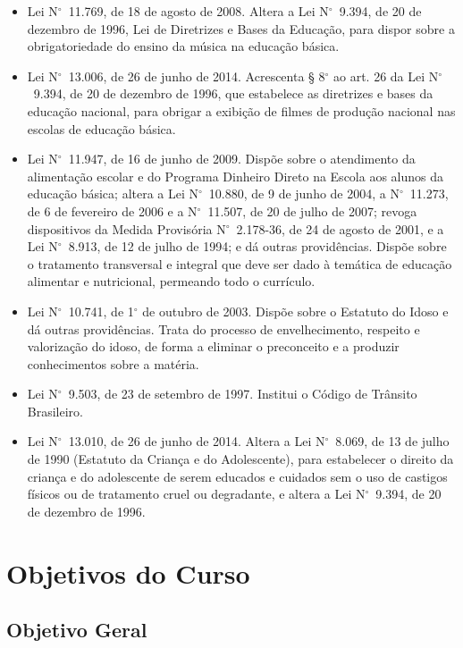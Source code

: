 \documentclass[
	12pt,				%
	openright,			%
	twoside,			%
	a4paper,			%
	chapter=TITLE,		%
	english,			%
	french,				%
	spanish,			%
	brazil,				%
	]{abntex2}
\newcommand{\n}{N$^\circ$}
\begin{document}
\begin{itemize}
    \item  Lei \n~11.769, de 18 de agosto de 2008. Altera a Lei \n~9.394, de 20 de dezembro de 1996, Lei de Diretrizes e Bases da Educação, para dispor sobre a obrigatoriedade do ensino da música na educação básica.
    \item  Lei \n~13.006, de 26 de junho de 2014. Acrescenta § 8$^\circ$ ao art. 26 da Lei \n~9.394, de 20 de dezembro de 1996, que estabelece as diretrizes e bases da educação nacional, para obrigar a exibição de filmes de produção nacional nas escolas de educação básica.
    \item  Lei \n~11.947, de 16 de junho de 2009. Dispõe sobre o atendimento da alimentação escolar e do Programa Dinheiro Direto na Escola aos alunos da educação básica; altera a Lei \n~10.880, de 9 de junho de 2004, a \n~11.273, de 6 de fevereiro de 2006 e a \n~11.507, de 20 de julho de 2007; revoga dispositivos da Medida Provisória \n~2.178-36, de 24 de agosto de 2001, e a Lei \n~8.913, de 12 de julho de 1994; e dá outras providências. Dispõe sobre o tratamento transversal e integral que deve ser dado à temática de educação alimentar e nutricional, permeando todo o currículo.
    
    \item Lei \n~10.741, de 1$^\circ$ de outubro de 2003. Dispõe sobre o Estatuto do Idoso e dá outras providências. Trata do processo de envelhecimento, respeito e valorização do idoso, de forma a eliminar o preconceito e a produzir conhecimentos sobre a matéria.
    \item Lei \n~9.503, de 23 de setembro de 1997. Institui o Código de Trânsito Brasileiro.
    \item  Lei \n~13.010, de 26 de junho de 2014. Altera a Lei \n~8.069, de 13 de julho de 1990 (Estatuto da Criança e do Adolescente), para estabelecer o direito da criança e do adolescente de serem educados e cuidados sem o uso de castigos físicos ou de tratamento cruel ou degradante, e altera a Lei \n~9.394, de 20 de dezembro de 1996.

\end{itemize}



\chapter{Objetivos do Curso}

\section{Objetivo Geral}
\end{document}
